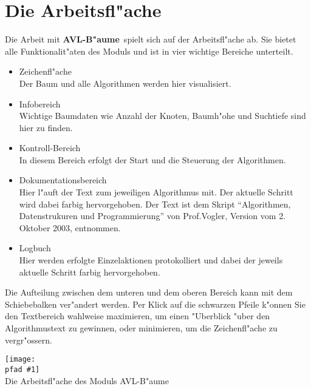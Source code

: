 \documentclass[a4paper,titlepage]{article}
\newcommand{\AVL}{\mbox{{\bf AVL-B"aume}}}
\newcommand{\pfad}{../pics/}
\newcommand{\centerpic}[3]{
	\begin{center}
		\texttt{[image: \\pfad \#1]} \\
		{\small #3}
	\end{center}
}
\begin{document}
\section{Die Arbeitsfl"ache}

Die Arbeit mit \AVL \ spielt sich auf der Arbeitsfl"ache ab. Sie bietet alle Funktionalit"aten 
des Moduls und ist in vier wichtige Bereiche unterteilt. 

\begin{itemize}
  \item {\sc Zeichenfl"ache} \\
		Der Baum und alle Algorithmen werden hier visualisiert.
  \item {\sc Infobereich} \\
		Wichtige Baumdaten wie Anzahl der Knoten, Baumh"ohe und Suchtiefe sind hier zu finden.
  \item {\sc Kontroll-Bereich} \\
		In diesem Bereich erfolgt der Start und die Steuerung der Algorithmen.
  \item {\sc Dokumentationsbereich} \\
		 Hier l"auft der Text zum jeweiligen Algorithmus mit. Der aktuelle Schritt wird dabei farbig hervorgehoben. 
		 Der Text ist dem Skript "`Algorithmen, Datenstrukuren und Programmierung"' von Prof.Vogler, 
		 Version vom 2. Oktober 2003, entnommen.
  \item {\sc Logbuch} \\
		 Hier werden erfolgte Einzelaktionen protokolliert und dabei der jeweils aktuelle Schritt farbig hervorgehoben.
\end{itemize}

Die Aufteilung zwischen dem unteren und dem oberen Bereich kann mit dem Schiebebalken ver"andert werden. 
Per Klick auf die schwarzen Pfeile k"onnen Sie den Textbereich wahlweise maximieren, um einen "Uberblick "uber 
den Algorithmustext zu gewinnen, oder minimieren, um die Zeichenfl"ache zu vergr"ossern.

\bigskip
\bigskip
\centerpic{prgmscreen}{0.7}{Die Arbeitsfl"ache des Moduls AVL-B"aume}
\end{document}
